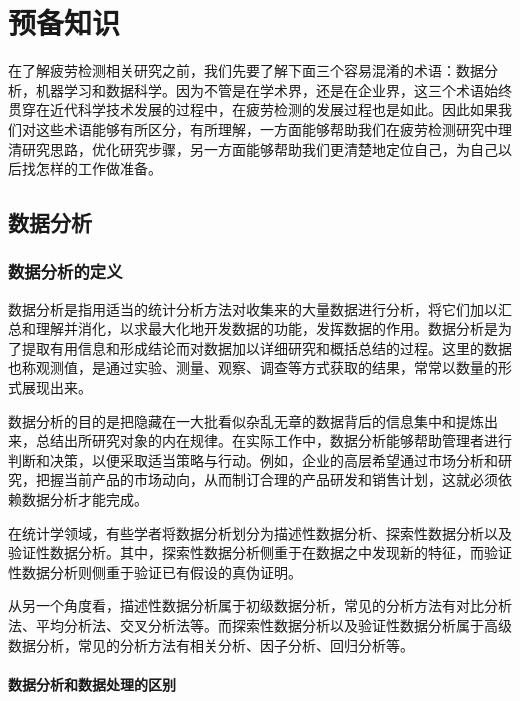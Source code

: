 
\chapter{预备知识}

在了解疲劳检测相关研究之前，我们先要了解下面三个容易混淆的术语：数据分析，机器学习和数据科学。因为不管是在学术界，还是在企业界，这三个术语始终贯穿在近代科学技术发展的过程中，在疲劳检测的发展过程也是如此。因此如果我们对这些术语能够有所区分，有所理解，一方面能够帮助我们在疲劳检测研究中理清研究思路，优化研究步骤，另一方面能够帮助我们更清楚地定位自己，为自己以后找怎样的工作做准备。

\section{数据分析}

\subsection{数据分析的定义}

数据分析是指用适当的统计分析方法对收集来的大量数据进行分析，将它们加以汇总和理解并消化，以求最大化地开发数据的功能，发挥数据的作用。数据分析是为了提取有用信息和形成结论而对数据加以详细研究和概括总结的过程。这里的数据也称观测值，是通过实验、测量、观察、调查等方式获取的结果，常常以数量的形式展现出来。

数据分析的目的是把隐藏在一大批看似杂乱无章的数据背后的信息集中和提炼出来，总结出所研究对象的内在规律。在实际工作中，数据分析能够帮助管理者进行判断和决策，以便采取适当策略与行动。例如，企业的高层希望通过市场分析和研究，把握当前产品的市场动向，从而制订合理的产品研发和销售计划，这就必须依赖数据分析才能完成。

在统计学领域，有些学者将数据分析划分为描述性数据分析、探索性数据分析以及验证性数据分析。其中，探索性数据分析侧重于在数据之中发现新的特征，而验证性数据分析则侧重于验证已有假设的真伪证明。

从另一个角度看，描述性数据分析属于初级数据分析，常见的分析方法有对比分析法、平均分析法、交叉分析法等。而探索性数据分析以及验证性数据分析属于高级数据分析，常见的分析方法有相关分析、因子分析、回归分析等。

\subsubsection{数据分析和数据处理的区别}

